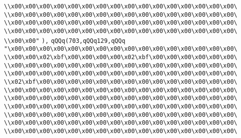 \verb|\\x00\x00\x00\x00\x00\x00\x00\x00\x00\x00\x00\x00\x00\x00\x00\x00\|\newline
\verb|\\x00\x00\x00\x00\x00\x00\x00\x00\x00\x00\x00\x00\x00\x00\x00\x00\|\newline
\verb|\\x00\x00\x00\x00\x00\x00\x00\x00\x00\x00\x00\x00\x00\x00\x00\x00\|\newline
\verb|\\x00\x00\x00\x00\x00\x00\x00\x00\x00\x00\x00\x00\x00\x00\x00\x00\|\newline
\verb|\\x00\x00"|\newline
\verb|),|\newline
\verb|qQQq(703,qQQq129,qQQq|\newline
\verb|"\x00\x00\x00\x00\x00\x00\x00\x00\x00\x00\x00\x00\x00\x00\x00\x00\|\newline
\verb|\\x00\x00\x02\xbf\x00\x00\x00\x00\x02\xbf\x00\x00\x00\x00\x00\x00\|\newline
\verb|\\x00\x00\x00\x00\x00\x00\x00\x00\x00\x00\x00\x00\x00\x00\x00\x00\|\newline
\verb|\\x00\x00\x00\x00\x00\x00\x00\x00\x00\x00\x00\x00\x00\x00\x00\x00\|\newline
\verb|\\x02\xbf\x00\x00\x00\x00\x00\x00\x00\x00\x00\x00\x00\x00\x00\x00\|\newline
\verb|\\x00\x00\x00\x00\x00\x00\x00\x00\x00\x00\x00\x00\x00\x00\x00\x00\|\newline
\verb|\\x00\x00\x00\x00\x00\x00\x00\x00\x00\x00\x00\x00\x00\x00\x00\x00\|\newline
\verb|\\x00\x00\x00\x00\x00\x00\x00\x00\x00\x00\x00\x00\x00\x00\x00\x00\|\newline
\verb|\\x00\x00\x00\x00\x00\x00\x00\x00\x00\x00\x00\x00\x00\x00\x00\x00\|\newline
\verb|\\x00\x00\x00\x00\x00\x00\x00\x00\x00\x00\x00\x00\x00\x00\x00\x00\|\newline
\verb|\\x00\x00\x00\x00\x00\x00\x00\x00\x00\x00\x00\x00\x00\x00\x00\x00\|\newline
